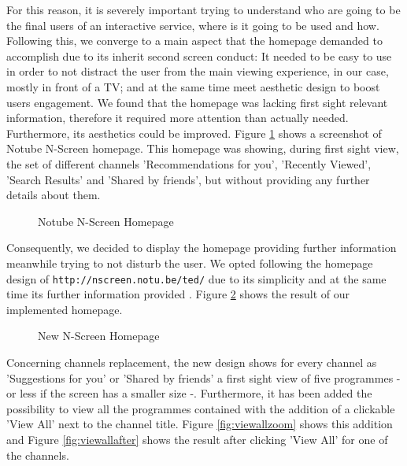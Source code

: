 \documentclass{acm_proc_article-sp}
\begin{document}
For this reason, it is severely important trying to understand who are going to be the final users of an interactive service, where is it going to be used and how. Following this, we converge to a main aspect that the homepage demanded to accomplish due to its inherit second screen conduct: It needed to be easy to use in order to not distract the user from the main viewing experience, in our case, mostly in front of a TV; and at the same time meet aesthetic design to boost users engagement. We found that the homepage  was lacking first sight relevant information, therefore it required more attention than actually needed. Furthermore, its aesthetics could be improved. Figure \ref{fig:oldhomepage} shows a screenshot of Notube N-Screen homepage. This homepage was showing, during first sight view, the set of different channels 'Recommendations for you', 'Recently Viewed', 'Search Results' and 'Shared by friends', but without providing any further details about them. 

\begin{figure}[!htb]
\centering
{}
\caption{Notube N-Screen Homepage}
\label{fig:oldhomepage}
\end{figure}

Consequently, we decided to display the homepage providing further information meanwhile trying to not disturb the user\cite{colborne2010simple}\cite{krug2014don}\cite{norman2002design}. We opted following the homepage design of \texttt{http://nscreen.notu.be/ted/} due to its simplicity and at the same time its further information provided \cite{nielsen2002homepage}. Figure \ref{fig:newhomepage} shows the result of our implemented homepage. 

\begin{figure}[!htb]
\centering
{}
\caption{New N-Screen Homepage}
\label{fig:newhomepage}
\end{figure}

Concerning channels replacement, the new design shows for every channel as 'Suggestions for you' or 'Shared by friends' a first sight view of five programmes -or less if the screen has a smaller size -. Furthermore, it has been added the possibility to view all the programmes contained with the addition of a clickable 'View All' next to the channel title. Figure \ref{fig:viewallzoom} shows this addition and Figure \ref{fig:viewallafter} shows the result after clicking 'View All' for one of the channels. 
\end{document}

